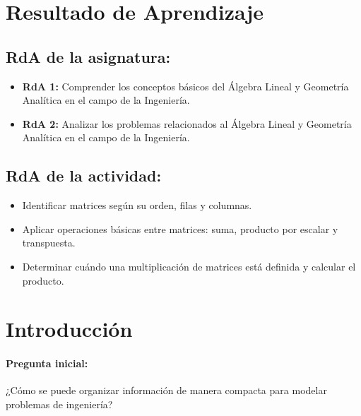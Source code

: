 \documentclass[a4,11pt]{aleph-notas}
\begin{document}
\encabezado

\section*{Resultado de Aprendizaje}  

\subsection*{RdA de la asignatura:}  
\begin{itemize}[leftmargin=*]  
    \item \textbf{RdA 1:} Comprender los conceptos básicos del Álgebra Lineal y Geometría Analítica en el campo de la Ingeniería.  
    \item \textbf{RdA 2:} Analizar los problemas relacionados al Álgebra Lineal y Geometría Analítica en el campo de la Ingeniería.  
\end{itemize}  

\subsection*{RdA de la actividad:}  
\begin{itemize}[leftmargin=*]  
    \item Identificar matrices según su orden, filas y columnas.  
    \item Aplicar operaciones básicas entre matrices: suma, producto por escalar y transpuesta.  
    \item Determinar cuándo una multiplicación de matrices está definida y calcular el producto.  
\end{itemize}  

\section*{Introducción}  

\paragraph{Pregunta inicial:}  
¿Cómo se puede organizar información de manera compacta para modelar problemas de ingeniería?
\end{document}
